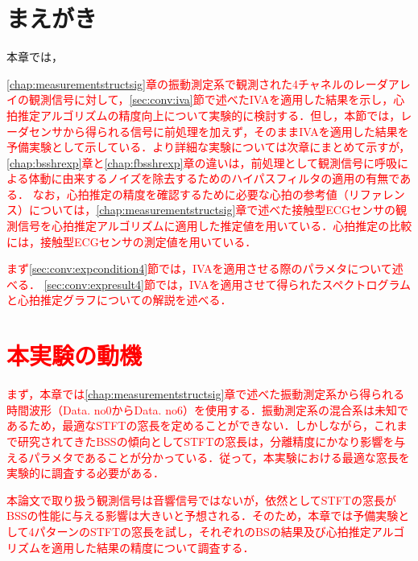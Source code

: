 \section{まえがき}
本章では，\textcolor{red}{\ref{chap:measurementstructsig}章の振動測定系で観測された4チャネルのレーダアレイの観測信号に対して，\textcolor{red}{\ref{sec:conv:iva}節で述べた}IVAを適用した結果を\textcolor{red}{示し，}心拍推定アルゴリズム\textcolor{red}{の精度向上について実験的に検討する．但し，本節では，レーダセンサから得られる信号に前処理を加えず，そのままIVAを適用した結果を予備実験として示している．より詳細な実験については次章にまとめて示すが，\ref{chap:bsshrexp}章と\ref{chap:fbsshrexp}章の違いは，前処理として観測信号に呼吸による体動に由来するノイズを除去するためのハイパスフィルタの適用の有無である．}
\textcolor{red}{なお，心拍推定の精度を確認するために必要な心拍の参考値（リファレンス）については，\ref{chap:measurementstructsig}章で述べた接触型ECGセンサの観測信号を心拍推定アルゴリズムに適用した推定値を用いている．}心拍推定の比較には，接触型ECGセンサの測定値を用いている．

まず\ref{sec:conv:expcondition4}節では，IVAを適用させる際のパラメタについて述べる．
\ref{sec:conv:expresult4}節では，IVAを適用させて得られたスペクトログラムと心拍推定グラフについての解説を述べる．

\section{本実験の動機}
\label{sec:conv:expmotivation}
\textcolor{red}{まず，本章では\ref{chap:measurementstructsig}章で述べた振動測定系から得られる時間波形（Data. no0からData. no6）を使用する．振動測定系の混合系は未知であるため，最適なSTFTの窓長を定めることができない．しかしながら，これまで研究されてきたBSSの傾向としてSTFTの窓長は，分離精度にかなり影響を与えるパラメタであることが分かっている\cite{winlengthBSS}．従って，本実験における最適な窓長を実験的に調査する必要がある．}

\textcolor{red}{本論文で取り扱う観測信号は音響信号ではないが，依然としてSTFTの窓長がBSSの性能に与える影響は大きいと予想される．そのため，本章では予備実験として4パターンのSTFTの窓長を試し，それぞれのBSの結果及び心拍推定アルゴリズムを適用した結果の精度について調査する．}

}

